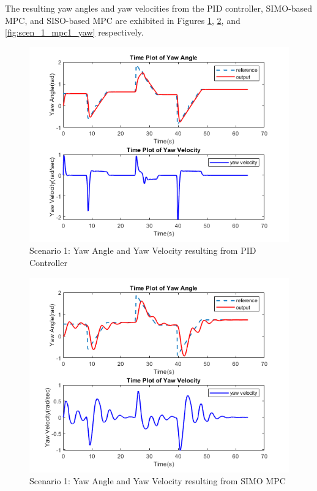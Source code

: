 \documentclass[a4paper, twocolumn]{article}
\begin{document}
The resulting yaw angles and yaw velocities from the PID controller, SIMO-based MPC, and SISO-based MPC are exhibited in Figures \ref{fig:scen_1_pid_yaw}, \ref{fig:scen_1_mpc2_yaw}, and \ref{fig:scen_1_mpc1_yaw} respectively. 

\begin{figure}
    \centering
    \includegraphics[scale=0.40]{img/scenario_1/pid-yaw.png}
    \caption{Scenario 1: Yaw Angle and Yaw Velocity resulting from PID Controller}
    \label{fig:scen_1_pid_yaw}
\end{figure}

\begin{figure}
    \centering
    \includegraphics[scale=0.40]{img/scenario_1/mpc2-yaw.png}
    \caption{Scenario 1: Yaw Angle and Yaw Velocity resulting from SIMO MPC}
    \label{fig:scen_1_mpc2_yaw}
\end{figure}
\end{document}
